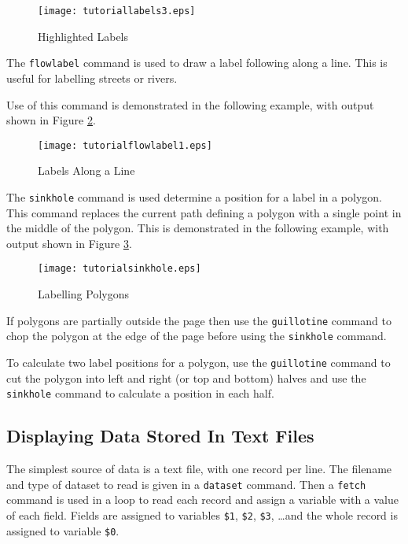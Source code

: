 

\begin{figure}[htb]
\texttt{[image: tutoriallabels3.eps]}
\caption{Highlighted Labels}
\label{tutoriallabels3}
\end{figure}

The \texttt{flowlabel} command is used to draw a label
following along a line.  This is useful for labelling streets or
rivers.

Use of this command is demonstrated in the following example,
with output shown in Figure \ref{tutoriallabels4}.



\begin{figure}[htb]
\texttt{[image: tutorialflowlabel1.eps]}
\caption{Labels Along a Line}
\label{tutoriallabels4}
\end{figure}

The \texttt{sinkhole} command is used determine a position
for a label in a polygon.  This command
replaces the current path defining a polygon with a single point in
the middle of the polygon.  This is demonstrated in the following
example, with output shown in Figure \ref{tutorialsinkhole}.



\begin{figure}[htb]
\texttt{[image: tutorialsinkhole.eps]}
\caption{Labelling Polygons}
\label{tutorialsinkhole}
\end{figure}

If polygons are partially outside the page then
use the \texttt{guillotine} command to chop the
polygon at the edge of the page before using the \texttt{sinkhole}
command.

To calculate two label positions for a polygon, use the \texttt{guillotine}
command to cut the polygon into left and right (or top and bottom)
halves and use the \texttt{sinkhole} command to calculate a
position in each half.

\subsection{Displaying Data Stored In Text Files}

The simplest source of data is a text file, with one record per line.  The
filename and type of dataset to read is given in a \texttt{dataset} command.
Then a \texttt{fetch} command is used in a loop to read each record
and assign a variable with a value of each field.
Fields are assigned to variables
\texttt{\$1}, \texttt{\$2}, \texttt{\$3}, \dots and the whole record is
assigned to variable \texttt{\$0}.

